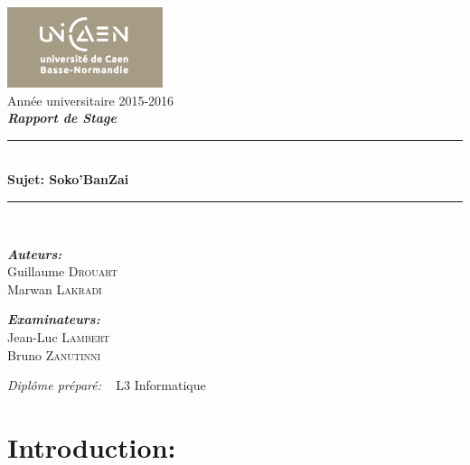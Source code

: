 \documentclass[a4paper,12pt]{article} %
\newcommand{\HRule}{\rule{\linewidth}{1mm}} %
\begin{document}



\begin{titlepage}
\begin{center}
\includegraphics[scale=0.5]{logo-ucbn.png}
\\[3cm]
\Large{Année universitaire 2015-2016}\\[0.5cm]
{\Large \textit{\bfseries {Rapport de Stage}}}
\\[1cm]
\HRule 
\\[0.4cm]

{\huge {\bfseries {Sujet: Soko'BanZai}}}
\\[0.4cm] 
\HRule\\[1.5cm]

\begin{minipage}{0.4\textwidth}
\begin{flushleft} \large
\emph{\bfseries {Auteurs:}}\\
Guillaume \textsc{Drouart}\\
Marwan \textsc{Lakradi}
\end{flushleft}
\end{minipage}
\begin{minipage}{0.4\textwidth}
\begin{flushright} \large
\emph{\bfseries{Examinateurs:}} \\
Jean-Luc \textsc{Lambert}\\
Bruno \textsc{Zanutinni}
\end{flushright}
\end{minipage}
\vfill
{\large \emph{Diplôme préparé:} ~ L3 Informatique}\\
\end{center}
\end{titlepage}



\renewcommand{\contentsname}{Sommaire}
\tableofcontents
\newpage

\section{Introduction:}
\end{document}
